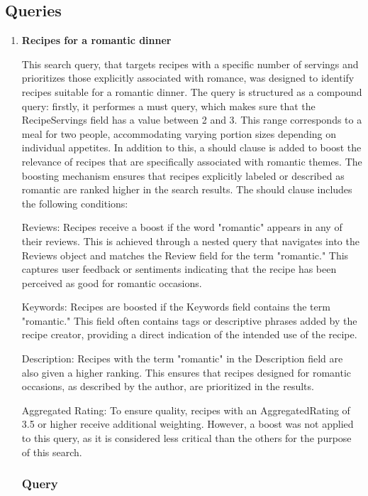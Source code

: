 \subsection{Queries}\label{sec:ElastisearchQueries}
\begin{enumerate}
    \item {}
          \textbf{Recipes for a romantic dinner}

    This search query, that targets recipes with a specific number of servings and prioritizes those explicitly associated with romance, was designed to identify recipes suitable for a romantic dinner. 
    The query is structured as a compound query: firstly, it performes a must query, which makes sure that the RecipeServings field has a value between 2 and 3. This range corresponds to a meal for two people, accommodating varying portion sizes depending on individual appetites.
    In addition to this, a should clause is added to boost the relevance of recipes that are specifically associated with romantic themes. The boosting mechanism ensures that recipes explicitly labeled or described as romantic are ranked higher in the search results. The should clause includes the following conditions:
    
    Reviews: Recipes receive a boost if the word "romantic" appears in any of their reviews. This is achieved through a nested query that navigates into the Reviews object and matches the Review field for the term "romantic." This captures user feedback or sentiments indicating that the recipe has been perceived as good for romantic occasions.

    Keywords: Recipes are boosted if the Keywords field contains the term "romantic." This field often contains tags or descriptive phrases added by the recipe creator, providing a direct indication of the intended use of the recipe.

    Description: Recipes with the term "romantic" in the Description field are also given a higher ranking. This ensures that recipes designed for romantic occasions, as described by the author, are prioritized in the results.

    Aggregated Rating: To ensure quality, recipes with an AggregatedRating of 3.5 or higher receive additional weighting. However, a boost was not applied to this query, as it is considered less critical than the others for the purpose of this search.

    \subsubsection{Query}
    \begin{lstlisting}[language=Elasticsearch]
    

\end{lstlisting}
\end{enumerate}
